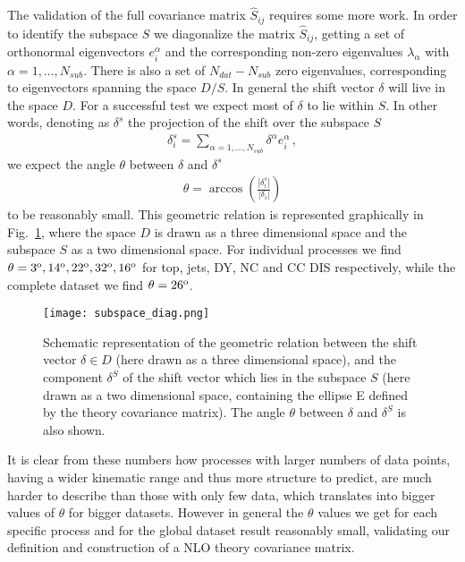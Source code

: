     The validation of the full covariance matrix $\hat{S}_{ij}$ requires some more work.
    In order to identify the subspace $S$ we diagonalize the matrix $\hat{S}_{ij}$, getting a set
    of orthonormal eigenvectors $e_i^{\alpha}$ and the corresponding non-zero eigenvalues 
    $\lambda_{\alpha}$ with $\alpha = 1, ..., N_{sub}$.
    There is also a set of $N_{dat}-N_{sub}$ zero eigenvalues, corresponding to eigenvectors spanning
    the space $D/S$.
    In general the shift vector $\delta$ will live in the space $D$. 
    For a successful test we expect most of $\delta$ to lie within $S$.
    In other words, denoting as $\delta^s$ the projection of the shift over the subspace $S$
    \begin{align}
        \delta_i^s = \sum_{\alpha=1,...,N_{sub}} \delta^{\alpha}e^{\alpha}_i\,,
    \end{align} 
    we expect the angle $\theta$ between $\delta$ and $\delta^s$
    \begin{align}
        \label{eq:angle}
        \theta = \arccos\left(\frac{|\delta_i^s|}{|\delta_i|}\right)
    \end{align}
    to be reasonably small. This geometric relation is represented graphically in Fig.~\ref{fig:subspace_diagram},
    where the space $D$ is drawn as a three dimensional space and the subspace $S$ as a two dimensional space.
    For individual processes we find $\theta = 3^{\rm o}, 14^{\rm o}, 22^{\rm o}, 32^{\rm o}, 16^{\rm o}$ for top, jets, DY, NC and CC DIS respectively, 
    while the complete dataset we find $\theta = 26^{\rm o}$.
    \begin{figure}[t]
        \begin{center}
          \texttt{[image: subspace\_diag.png]}
          \caption{\small Schematic representation of the geometric relation
            between the shift vector $\delta\in D$ (here drawn as a three dimensional space), and
            the component $\delta^S$ of the shift vector which lies in the 
      subspace $S$ (here drawn as a two dimensional space, containing the ellipse E defined by the theory covariance matrix). 
      The angle $\theta$ between $\delta$ and $\delta^S$ is also shown.
          \label{fig:subspace_diagram} }
        \end{center}
      \end{figure}
    It is clear from these numbers how processes with larger numbers of data points, having 
    a wider kinematic range and thus more structure to predict, are much harder to describe than those 
    with only few data, which translates into bigger values of $\theta$ for bigger datasets. However in general the
    $\theta$ values we get for each specific process and for the global dataset result reasonably small, validating our definition
    and construction of a NLO theory covariance matrix.

